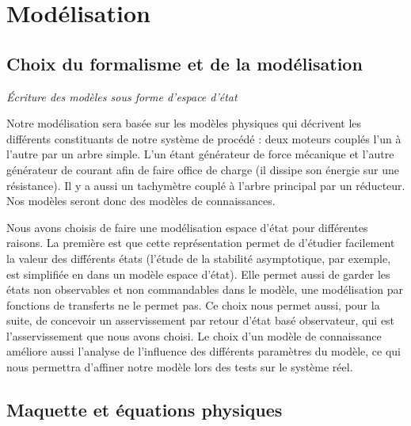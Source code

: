 \chapter{Modélisation}
\label{chap:modelisation}

\section{Choix du formalisme et de la modélisation}
\textit{Écriture des modèles sous forme d'espace d'état}

Notre modélisation sera basée sur les modèles physiques qui décrivent les différents constituants de notre système de procédé : deux moteurs couplés l'un à l'autre par un arbre simple. L'un étant générateur de force mécanique et l'autre générateur de courant afin de faire office de charge (il dissipe son énergie sur une résistance). Il y a aussi un tachymètre couplé à l'arbre principal par un réducteur.
Nos modèles seront donc des modèles de connaissances.

Nous avons choisis de faire une modélisation espace d'état pour différentes raisons. La première est que cette représentation permet de d'étudier facilement la valeur des différents états (l'étude de la stabilité asymptotique, par exemple, est simplifiée en dans un modèle espace d'état). Elle permet aussi de garder les états non observables et non commandables dans le modèle, une modélisation par fonctions de transferts ne le permet pas. Ce choix nous permet aussi, pour la suite, de concevoir un asservissement par retour d'état basé observateur, qui est l'asservissement que nous avons choisi. Le choix d'un modèle de connaissance améliore aussi l'analyse de l'influence des différents paramètres du modèle, ce qui nous permettra d'affiner notre modèle lors des tests sur le système réel. 



\section{Maquette et équations physiques}

